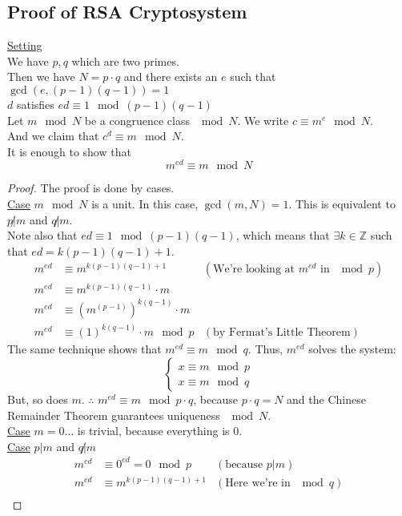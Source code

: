 \documentclass[10pt]{article}
\newcommand{\Z}{\mathbb{Z}}
\theoremstyle{definition}
\theoremstyle{remark}
\def\Z{\mathbb{ Z}}
\def\ul{\underline}
\begin{document}
\subsection{Proof of RSA Cryptosystem}
\ul{Setting}\\
We have $p,q$ which are two primes.\\
Then we have $N = p \cdot q$ and there exists an $e$ such that $\gcd(e,(p-1)(q-1)) = 1$\\
$d$ satisfies $ed \equiv 1 \mod(p-1)(q-1)$\\
Let $m \mod N$ be a congruence class $\mod N$.  We write $c \equiv m^e \mod N$.\\
And we claim that $c^d \equiv m \mod N$.\\
It is enough to show that $$m^{ed} \equiv m \mod N$$
\begin{proof}
The proof is done by cases.\\
\ul{Case} $m \mod N$ is a unit.  In this case, $\gcd(m,N) = 1$.  This is equivalent to $p \not | m$ and $q \not | m$.\\
Note also that $ed \equiv 1 \mod(p-1)(q-1)$, which means that $\exists k \in \Z$ such that $ed = k(p-1)(q-1) + 1$.
\begin{align*}
m^{ed} & \equiv m^{k(p-1)(q-1) + 1} &(\text{We're looking at $m^{ed}$ in $\mod p$})\\
m^{ed} & \equiv m^{k(p-1)(q-1)} \cdot m \\
m^{ed} & \equiv (m^{(p-1)})^{k(q-1)} \cdot m \\
m^{ed} & \equiv (1)^{k(q-1)} \cdot m \mod p &(\text{by Fermat's Little Theorem})
\end{align*}
The same technique shows that $m^{ed} \equiv m \mod q$.  Thus, $m^{ed}$ solves the system: 
$$\begin{cases}
x \equiv m \mod p\\
x \equiv m \mod q
\end{cases}$$
But, so does $m$.  $\therefore$ $m^{ed} \equiv m \mod p \cdot q$, because $p \cdot q = N$ and the Chinese Remainder Theorem guarantees uniqueness $\mod N$.\\
\ul{Case} $m = 0...$ is trivial, because everything is 0.\\
\ul{Case} $p|m$ and $q \not |m$\\
\begin{align*}
m^{ed} &\equiv 0^{ed} = 0 \mod p &(\text{because $p|m$})\\
m^{ed} & \equiv m^{k(p-1)(q-1) + 1} &(\text{Here we're in $\mod q$})\\

\end{align*}
\end{proof}
\end{document}

